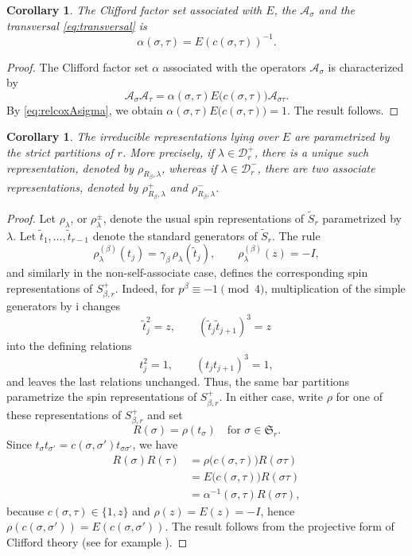 \documentclass[reqno]{amsart}
\newcommand{\tSym}{\widetilde{S}}
\newcommand{\sym}{\mathfrak{S}}
\newtheorem{corollary}[theorem]{Corollary}
\theoremstyle{definition}
\begin{document}
\begin{corollary}
The Clifford factor set associated with $E$, the $\mathcal A_\sigma$ and
the transversal \eqref{eq:transversal} is
$$\alpha(\sigma,\tau)=E(c(\sigma,\tau))^{-1}.$$
\end{corollary}


\begin{proof}

The Clifford factor set $\alpha$ associated with the operators $\mathcal
A_\sigma$ is characterized by
\[
\mathcal A_\sigma\mathcal A_\tau
=
\alpha(\sigma,\tau)
E\bigl(c(\sigma,\tau)\bigr)
\mathcal A_{\sigma\tau}.
\]
By \eqref{eq:relcoxAsigma}, we obtain
$
\alpha(\sigma,\tau)
E\bigl(c(\sigma,\tau)\bigr)=1.
$
The result follows.
\end{proof}

\begin{corollary}
\label{cor:paramSA}
The irreducible representations lying over $E$ are parametrized by the
strict partitions of $r$. More precisely, if $\lambda\in\mathcal D_r^+$,
there is a unique such representation, denoted by $\rho_{R_\beta,\lambda}$,
whereas if $\lambda\in\mathcal D_r^-$, there are two associate
representations, denoted by
$\rho_{R_\beta,\lambda}^+$ and $\rho_{R_\beta,\lambda}^-$.
\end{corollary}

\begin{proof}
Let $\rho_\lambda$, or $\rho_\lambda^\pm$, denote the usual spin
representations of $\tSym_r$ parametrized by $\lambda$. Let
$\widetilde t_1,\ldots,\widetilde t_{r-1}$ denote the standard generators
of $\tSym_r$. The rule
\[
\rho_\lambda^{(\beta)}(t_j)
=
\gamma_\beta\,\rho_\lambda(\widetilde t_j),
\qquad
\rho_\lambda^{(\beta)}(z)=-I,
\]
and similarly in the non-self-associate case, defines the corresponding
spin representations of $S_{\beta,r}^+$. Indeed, for
$p^\beta\equiv-1\pmod4$, multiplication of the simple generators by
$\mathrm i$ changes
\[
\widetilde t_j^2=z,\qquad
(\widetilde t_j\widetilde t_{j+1})^3=z
\]
into the defining relations
\[
t_j^2=1,\qquad
(t_jt_{j+1})^3=1,
\]
and leaves the last relations unchanged. Thus, the same bar
partitions parametrize the spin representations of $S_{\beta,r}^+$.
In either case, write $\rho$ for one of these representations of
$S_{\beta,r}^+$ and set
\begin{equation}
\label{eq:defR}
R(\sigma)=\rho(t_\sigma)
\quad
\text{for }\sigma\in\sym_r.
\end{equation}
Since $ t_\sigma t_{\sigma'} = c(\sigma,\sigma')t_{\sigma\sigma'} $, we
have
\[
\begin{aligned}
R(\sigma)R(\tau)
&=
\rho\bigl(c(\sigma,\tau)\bigr)R(\sigma\tau)\\
&=
E\bigl(c(\sigma,\tau)\bigr)R(\sigma\tau)\\
&=
\alpha^{-1}(\sigma,\tau)R(\sigma\tau),
\end{aligned}
\]
because $c(\sigma,\tau)\in\{1,z\}$ and $ \rho(z)=E(z)=-I$, hence
$\rho(c(\sigma,\sigma'))=E(c(\sigma,\sigma'))$. The result follows from
the projective form of Clifford theory (see for example
\cite[Chapter~11]{isaacs}).
\end{proof}
\end{document}
